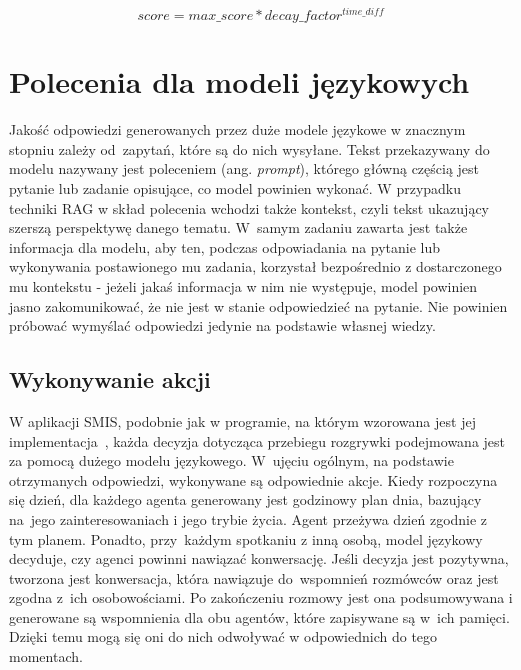 \begin{equation}
 \label{eq:metryka_niedawnosci}
	score = max\_score * decay\_factor ^ {time\_diff}
\end{equation}




\section{Polecenia dla modeli językowych}

Jakość odpowiedzi generowanych przez duże modele językowe w znacznym stopniu zależy od~zapytań, które są do nich wysyłane. Tekst przekazywany do modelu nazywany jest poleceniem (ang. \textit{prompt}), którego główną częścią jest pytanie lub zadanie opisujące, co model powinien wykonać. W przypadku techniki RAG w skład polecenia wchodzi także kontekst, czyli tekst ukazujący szerszą perspektywę danego tematu. W~samym zadaniu zawarta jest także informacja dla modelu, aby ten, podczas odpowiadania na pytanie lub wykonywania postawionego mu zadania, korzystał bezpośrednio z dostarczonego mu kontekstu - jeżeli jakaś informacja w nim nie występuje, model powinien jasno zakomunikować, że nie jest w stanie odpowiedzieć na pytanie. Nie powinien próbować wymyślać odpowiedzi jedynie na podstawie własnej wiedzy.

\subsection{Wykonywanie akcji}

W aplikacji SMIS, podobnie jak w programie, na którym wzorowana jest jej implementacja~\cite{park2023generativeagentsinteractivesimulacra}, każda decyzja dotycząca przebiegu rozgrywki podejmowana jest za pomocą dużego modelu językowego. W~ujęciu ogólnym, na podstawie otrzymanych odpowiedzi, wykonywane są odpowiednie akcje. Kiedy rozpoczyna się dzień, dla każdego agenta generowany jest godzinowy plan dnia, bazujący na~jego zainteresowaniach i jego trybie życia. Agent przeżywa dzień zgodnie z tym planem. Ponadto, przy~każdym spotkaniu z inną osobą, model językowy decyduje, czy agenci powinni nawiązać konwersację. Jeśli decyzja jest pozytywna, tworzona jest konwersacja, która nawiązuje do~wspomnień rozmówców oraz jest zgodna z~ich osobowościami. Po zakończeniu rozmowy jest ona podsumowywana i generowane są wspomnienia dla obu agentów, które zapisywane są w~ich pamięci. Dzięki temu mogą się oni do nich odwoływać w odpowiednich do tego momentach.

